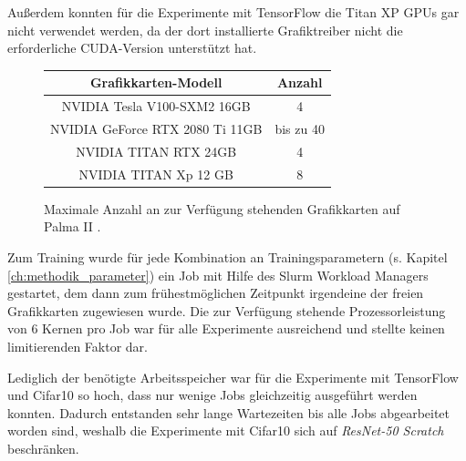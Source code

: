 Außerdem konnten für die Experimente mit TensorFlow \cite{tensorflow} die Titan XP GPUs gar nicht verwendet werden, da der dort installierte Grafiktreiber nicht die erforderliche CUDA-Version unterstützt hat.

\begin{figure}[H]
\begin{tabular}{|c|c|}
\hline 
Grafikkarten-Modell & Anzahl \\ 
\hline 
NVIDIA Tesla V100-SXM2 16GB & 4 \\ 
\hline 
NVIDIA GeForce RTX 2080 Ti 11GB & bis zu 40\\
\hline
NVIDIA TITAN RTX 24GB & 4\\
\hline
NVIDIA TITAN Xp 12 GB & 8\\
\hline
\end{tabular} 
\caption{Maximale Anzahl an zur Verfügung stehenden Grafikkarten auf Palma II \cite{palma2}.}
\label{tab:palmaGPUs}
\end{figure}

Zum Training wurde für jede Kombination an Trainingsparametern (s. Kapitel \ref{ch:methodik_parameter}) ein Job mit Hilfe des Slurm Workload Managers \cite{slurm} gestartet, dem dann zum frühestmöglichen Zeitpunkt irgendeine der freien Grafikkarten zugewiesen wurde. Die zur Verfügung stehende Prozessorleistung von 6 Kernen pro Job war für alle Experimente ausreichend und stellte keinen limitierenden Faktor dar.

Lediglich der benötigte Arbeitsspeicher war für die Experimente mit TensorFlow \cite{tensorflow} und Cifar10 \cite{cifar10} so hoch, dass nur wenige Jobs gleichzeitig ausgeführt werden konnten. Dadurch entstanden sehr lange Wartezeiten bis alle Jobs abgearbeitet worden sind, weshalb die Experimente mit Cifar10 \cite{cifar10} sich auf \textit{ResNet-50 Scratch} beschränken.

